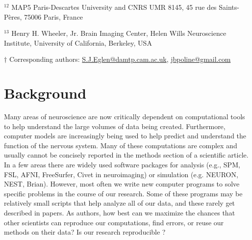 \documentclass[11pt]{article}
\begin{document}
\noindent $^{12}$ MAP5 Paris-Descartes University and CNRS UMR 8145, 
45 rue des Saints-P\`{e}res, 75006 Paris, France

\noindent $^{13}$  Henry H. Wheeler, Jr. Brain Imaging Center, Helen Wills Neuroscience Institute, University of California, Berkeley, USA

\vspace*{2mm}
\noindent $\dagger$
Corresponding authors: \url{S.J.Eglen@damtp.cam.ac.uk}, \url{jbpoline@gmail.com}

\clearpage


\renewcommand{\cite}[1]{\autocite{#1}}

\linenumbers

\section*{Background}

Many areas of neuroscience are now critically dependent on
computational tools to help understand the large volumes of data being
created.  Furthermore, computer models are increasingly being used to
help predict and understand the function of the nervous system.  Many
of these computations are complex and usually cannot be concisely
reported in the methods section of a scientific article.  In a few
areas there are widely used software packages for
analysis (e.g., SPM, FSL, AFNI, FreeSurfer, Civet in
neuroimaging) or simulation (e.g. NEURON, NEST, Brian).
However, most often we write new computer programs to solve
specific problems in the course of our research.  Some of these
programs may be relatively small scripts that help analyze all of our
data, and these rarely get described in papers.  As authors, how best
can we maximize the chances that other scientists can reproduce our
computations, find errors, or reuse our methods on their data?  Is our research
reproducible \cite{web:naturefocus}?
\end{document}
